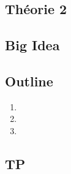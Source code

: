 \documentclass{article}
\begin{document}
\subsection{Théorie 2}
\subsection*{Big Idea}
\subsection*{Outline}
\begin{enumerate}
    \item
    \item
    \item
\end{enumerate}
\subsection{TP}

\pagebreak
\end{document}
